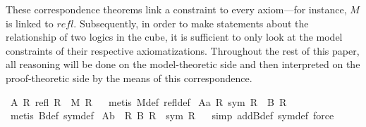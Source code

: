 \begin{isabellebody}
\begin{isamarkuptext}
These correspondence theorems link a constraint to every axiom---for instance, $M$ is linked to $\mathit{refl}$.
Subsequently, in order to make statements about the relationship of two logics in the cube, it is sufficient to only look at the model constraints of their
respective axiomatizations. Throughout the rest of this paper, all reasoning will be done on the model-theoretic
side and then interpreted on the proof-theoretic side by the means of this correspondence.%
\end{isamarkuptext}%
\isamarkuptrue%
%
\isamarkuptrue%
\isamarkupfalse%
\ A{}{\isacharcolon}\ {\isachardoublequoteopen}{\isacharparenleft}{\isasymforall}R{\isachardot}\ {\isacharparenleft}refl\ R{\isacharparenright}\ {\isasymlongleftrightarrow}\ {\isacharparenleft}M\ R{\isacharparenright}{\isacharparenright}{\isachardoublequoteclose}%
\isadelimproof
\ %
\endisadelimproof
%
\isatagproof
{}\isamarkupfalse%
\ {\isacharparenleft}metis\ M{\isacharunderscore}def\ refl{\isacharunderscore}def{\isacharparenright}%
\endisatagproof
{\isafoldproof}%
%
\isadelimproof
%
\endisadelimproof
%
\isamarkuptrue%
\isamarkupfalse%
\ A{}{\isacharunderscore}a{\isacharcolon}\ {\isachardoublequoteopen}{\isacharparenleft}{\isasymforall}R{\isachardot}\ {\isacharparenleft}sym\ R{\isacharparenright}\ {\isasymlongrightarrow}\ {\isacharparenleft}B\ R{\isacharparenright}{\isacharparenright}{\isachardoublequoteclose}%
\isadelimproof
\ %
\endisadelimproof
%
\isatagproof
{}\isamarkupfalse%
\ {\isacharparenleft}metis\ B{\isacharunderscore}def\ sym{\isacharunderscore}def{\isacharparenright}%
\endisatagproof
{\isafoldproof}%
%
\isadelimproof
%
\endisadelimproof
\isanewline
{}\isamarkupfalse%
\ A{}{\isacharunderscore}b{\isacharcolon}\ \ {\isachardoublequoteopen}{\isacharparenleft}{\isasymforall}R{\isachardot}\ {\isacharparenleft}B\ R{\isacharparenright}\ {\isasymlongrightarrow}\ {\isacharparenleft}sym\ R{\isacharparenright}{\isacharparenright}{\isachardoublequoteclose}%
\isadelimproof
\ %
\endisadelimproof
%
\isatagproof
{}\isamarkupfalse%
\ {\isacharparenleft}simp\ add{\isacharcolon}B{\isacharunderscore}def\ sym{\isacharunderscore}def{\isacharcomma}\ force{\isacharparenright}%
\endisatagproof
{\isafoldproof}%
%
\isadelimproof
%
\endisadelimproof
\isanewline

\end{isabellebody}
